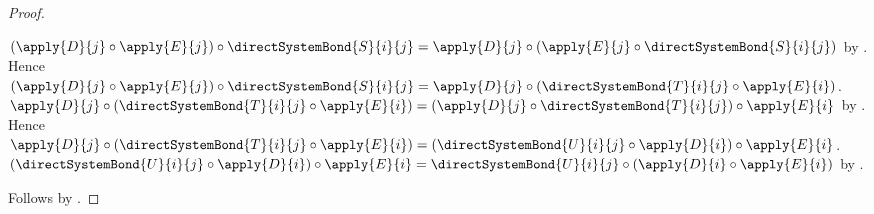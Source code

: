 \begin{proof}
\begin{subproof}
        $(\apply{D}{j}\circ\apply{E}{j})\circ
            \directSystemBond{S}{i}{j}
            =\apply{D}{j}\circ
                (\apply{E}{j}\circ\directSystemBond{S}{i}{j})$ by
            .
        Hence $(\apply{D}{j}\circ\apply{E}{j})\circ
            \directSystemBond{S}{i}{j}
            =\apply{D}{j}\circ
                (\directSystemBond{T}{i}{j}\circ\apply{E}{i})$.
        $\apply{D}{j}\circ
            (\directSystemBond{T}{i}{j}\circ\apply{E}{i})
            =(\apply{D}{j}\circ\directSystemBond{T}{i}{j})
                \circ\apply{E}{i}$ by
            .
        Hence $\apply{D}{j}\circ
            (\directSystemBond{T}{i}{j}\circ\apply{E}{i})
            =(\directSystemBond{U}{i}{j}\circ\apply{D}{i})
                \circ\apply{E}{i}$.
        $(\directSystemBond{U}{i}{j}\circ\apply{D}{i})
                \circ\apply{E}{i}
            =\directSystemBond{U}{i}{j}\circ
                (\apply{D}{i}\circ\apply{E}{i})$ by
            .
    \end{subproof}
    Follows by .
\end{proof}

